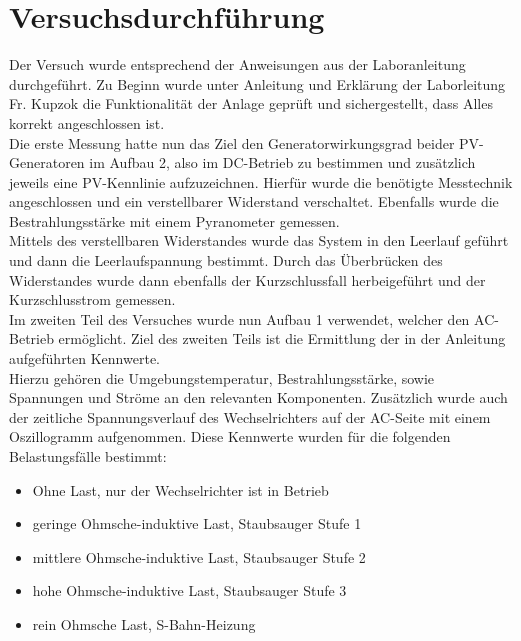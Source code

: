 \section{Versuchsdurchführung}
Der Versuch wurde entsprechend der Anweisungen aus der Laboranleitung \cite{Laboranleitung} durchgeführt.
Zu Beginn wurde unter Anleitung und Erklärung der Laborleitung Fr. Kupzok die
Funktionalität der Anlage geprüft und sichergestellt, dass Alles korrekt angeschlossen ist.\\
Die erste Messung hatte nun das Ziel den Generatorwirkungsgrad beider PV-Generatoren im Aufbau 2, also im DC-Betrieb zu bestimmen
und zusätzlich jeweils eine PV-Kennlinie aufzuzeichnen. Hierfür wurde die benötigte Messtechnik angeschlossen und ein verstellbarer Widerstand verschaltet.
Ebenfalls wurde die Bestrahlungsstärke mit einem Pyranometer gemessen.\\
Mittels des verstellbaren Widerstandes wurde das System in den Leerlauf geführt und dann die Leerlaufspannung bestimmt.
Durch das Überbrücken des Widerstandes wurde dann ebenfalls der Kurzschlussfall herbeigeführt und der Kurzschlusstrom gemessen.\\
Im zweiten Teil des Versuches wurde nun Aufbau 1 verwendet, welcher den AC-Betrieb ermöglicht.
Ziel des zweiten Teils ist die Ermittlung der in der Anleitung \cite[S.8]{Laboranleitung} aufgeführten Kennwerte.\\
Hierzu gehören die Umgebungstemperatur, Bestrahlungsstärke, sowie Spannungen und Ströme an den relevanten Komponenten.
Zusätzlich wurde auch der zeitliche Spannungsverlauf des Wechselrichters auf der AC-Seite mit einem Oszillogramm aufgenommen.
Diese Kennwerte wurden für die folgenden Belastungsfälle bestimmt:
\begin{itemize}
    \item Ohne Last, nur der Wechselrichter ist in Betrieb
    \item geringe Ohmsche-induktive Last, Staubsauger Stufe 1
    \item mittlere Ohmsche-induktive Last, Staubsauger Stufe 2
    \item hohe Ohmsche-induktive Last, Staubsauger Stufe 3
    \item rein Ohmsche Last, S-Bahn-Heizung
\end{itemize}
